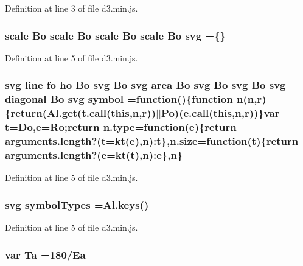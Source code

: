 Definition at line 3 of file d3.\+min.\+js.

\subsubsection[{svg}]{ {\bf scale} {\bf Bo} {\bf scale} {\bf Bo} {\bf scale} {\bf Bo} {\bf scale} {\bf Bo} svg =\{\}}\label{d3_8min_8js_af25f8d4d79615efc41c28e27e6bffae8}


Definition at line 5 of file d3.\+min.\+js.

\subsubsection[{symbol}]{ {\bf svg} {\bf line} {\bf fo} {\bf ho} {\bf Bo} {\bf svg} {\bf Bo} {\bf svg} {\bf area} {\bf Bo} {\bf svg} {\bf Bo} {\bf svg} {\bf Bo} {\bf svg} {\bf diagonal} {\bf Bo} {\bf svg} symbol =function()\{function {\bf n}({\bf n},{\bf r})\{{\bf return}(Al.\+get({\bf t.\+call}({\bf this},{\bf n},{\bf r}))$\vert$$\vert${\bf Po})({\bf e.\+call}({\bf this},{\bf n},{\bf r}))\}var t={\bf Do},{\bf e}={\bf Ro};{\bf return} n.\+type=function({\bf e})\{{\bf return} arguments.\+length?(t=kt({\bf e}),{\bf n})\+:t\},{\bf n.\+size}=function(t)\{{\bf return} arguments.\+length?({\bf e}=kt(t),{\bf n})\+:{\bf e}\},{\bf n}\}}\label{d3_8min_8js_a990c76424d47e1c3f841f6c34f2030ec}


Definition at line 5 of file d3.\+min.\+js.

\subsubsection[{symbol\+Types}]{ {\bf svg} symbol\+Types ={\bf Al.\+keys}()}\label{d3_8min_8js_a7d76cd17962cc60400ba8e116aa113a9}


Definition at line 5 of file d3.\+min.\+js.

\subsubsection[{Ta}]{\setlength{\rightskip}{0pt plus 5cm}var Ta =180/{\bf Ea}}\label{d3_8min_8js_a331b0287ead2c23136443408c9c0f390}



